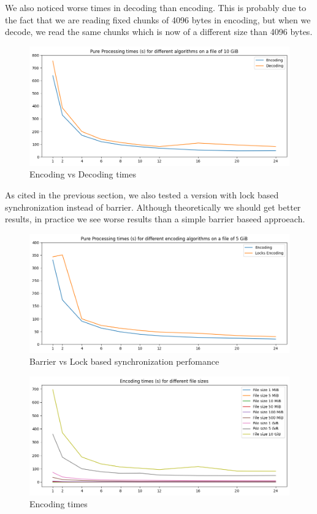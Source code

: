 We also noticed worse times in decoding than encoding. This is probably due to the fact that we are reading fixed chunks of 4096 bytes in encoding, but when we decode, we read the same chunks which is now of a different size than 4096 bytes. 

\begin{figure}
	\centering
	\includegraphics[width=0.8\linewidth]{"../imgs/Encoding vs Decoding"}
	\caption{Encoding vs Decoding times}
	\label{fig:encoding-vs-decoding}
\end{figure}

As cited in the previous section, we also tested a version with lock based synchronization instead of barrier. Although theoretically we should get better results, in practice we see worse results than a simple barrier baseed approeach.
\begin{figure}
	\centering
	\includegraphics[width=0.8\linewidth]{"../imgs/Barrier vs Locks encoding"}
	\caption{Barrier vs Lock based synchronization perfomance}
	\label{fig:barrier-vs-locks-encoding}
\end{figure}

\begin{figure}
	\centering
	\includegraphics[width=0.8\linewidth]{"../imgs/Encoding Barrier times"}
	\caption{Encoding times}
	\label{fig:encoding-barrier-times}
\end{figure}

